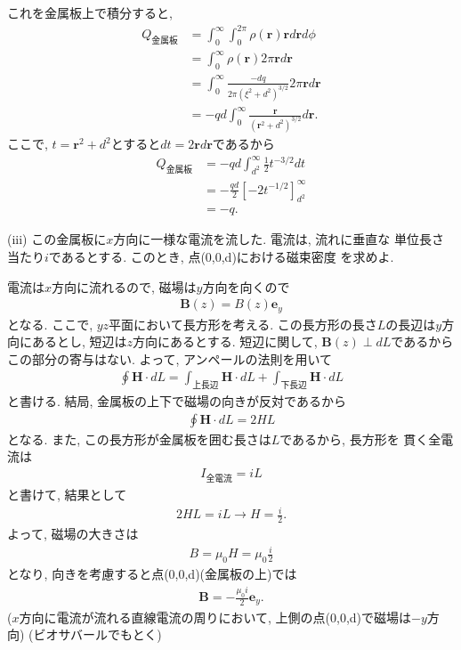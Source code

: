 \documentclass[a4paper,12pt]{jlreq}
\begin{document}
これを金属板上で積分すると, 
\begin{align}
  Q_{金属板} &= \int_{0}^{\infty} \int_{0}^{2\pi} \rho(\bm{r}) \bm{r}d\bm{r}d\phi \\
  &= \int_{0}^{\infty} \rho(\bm{r}) 2\pi \bm{r}d\bm{r}\\
  &= \int_{0}^{\infty} \frac{-dq}{2\pi (\xi^2 + d^2)^{3/2}} 2\pi \bm{r}d\bm{r} \\
  &= -qd \int_{0}^{\infty} \frac{\bm{r}}{(\bm{r}^2 + d^2)^{3/2}} d\bm{r}.
\end{align}
ここで, $t = \bm{r}^2 + d^2$とすると$dt = 2\bm{r}d\bm{r}$であるから
\begin{align}
  Q_{金属板} &= -qd \int_{d^2}^{\infty} \frac{1}{2} t^{-3/2} dt\\
  &= -\frac{qd}{2} \left[-2 t^{-1/2}\right]_{d^2}^{\infty}\\
  &= -q.
\end{align}



\begin{itembox}[l]{(iii)}
  この金属板に$x$方向に一様な電流を流した. 電流は, 流れに垂直な
  単位長さ当たり$i$であるとする. このとき, 点(0,0,d)における磁束密度
  を求めよ. 
\end{itembox}
\par
電流は$x$方向に流れるので, 磁場は$y$方向を向くので
\begin{align}
  \bm{B}(z) = B(z)\bm{e}_y
\end{align}
となる. ここで, $yz$平面において長方形を考える. 
この長方形の長さ$L$の長辺は$y$方向にあるとし, 短辺は$z$方向にあるとする. 
短辺に関して, $\bm{B}(z) \perp dL$であるからこの部分の寄与はない. 
よって, アンペールの法則を用いて
\begin{align}
  \oint \bm{H} \cdot dL = \int_{上長辺}^{} \bm{H} \cdot dL + \int_{下長辺}^{} \bm{H} \cdot dL
\end{align}
と書ける. 
結局, 金属板の上下で磁場の向きが反対であるから
\begin{align}
  \oint \bm{H} \cdot dL = 2HL
\end{align}
となる. また, この長方形が金属板を囲む長さは$L$であるから, 長方形を
貫く全電流は
\begin{align}
  I_{全電流} = iL
\end{align}
と書けて, 結果として
\begin{align}
  2HL = iL \rightarrow H = \frac{i}{2}.
\end{align}
よって, 磁場の大きさは
\begin{align}
  B = \mu_0 H = \mu_0 \frac{i}{2}
\end{align}
となり, 向きを考慮すると点(0,0,d)(金属板の上)では
\begin{align}
  \bm{B} = -\frac{\mu_0 i}{2} \bm{e}_y.
\end{align}
($x$方向に電流が流れる直線電流の周りにおいて, 上側の点(0,0,d)で磁場は$-y$方向)
(ビオサバールでもとく)
\end{document}
